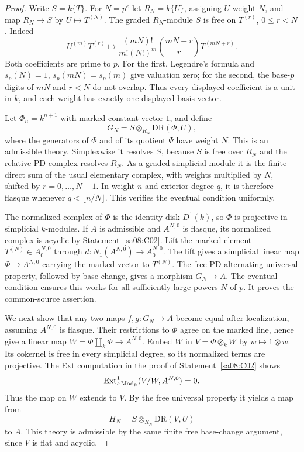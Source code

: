 \begin{proof}
Write $S=k\{T\}$. For $N=p^e$ let $R_N=k\{U\}$, assigning $U$
weight $N$, and map $R_N\to S$ by $U\mapsto T^{(N)}$. The graded
$R_N$-module $S$ is free on $T^{(r)}$, $0\le r<N$. Indeed
\[
 U^{(m)}T^{(r)}\longmapsto
 \frac{(mN)!}{m!(N!)^m}\binom{mN+r}{r}T^{(mN+r)}.
\]
Both coefficients are prime to $p$. For the first, Legendre's
formula and $s_p(N)=1$, $s_p(mN)=s_p(m)$ give valuation zero; for
the second, the base-$p$ digits of $mN$ and $r<N$ do not overlap.
Thus every displayed coefficient is a unit in $k$, and each weight
has exactly one displayed basis vector.

Let $\Phi_n=k^{n+1}$ with marked constant vector $1$, and define
\[
 G_N=S\otimes_{R_N}\mathrm{DR}(\Phi,U),
\]
where the generators of $\Phi$ and of its quotient $\Psi$ have
weight $N$. This is an admissible theory. Simplexwise it resolves
$S$, because $S$ is free over $R_N$ and the relative PD complex
resolves $R_N$. As a graded simplicial module it is the finite direct
sum of the usual elementary complex, with weights multiplied by
$N$, shifted by $r=0,\ldots,N-1$. In weight $n$ and exterior degree
$q$, it is therefore flasque whenever
$q<\lfloor n/N\rfloor$. This verifies the eventual condition
uniformly.

The normalized complex of $\Phi$ is the identity disk $D^1(k)$,
so $\Phi$ is projective in simplicial $k$-modules. If $A$ is
admissible and $A^{N,0}$ is flasque, its normalized complex is
acyclic by Statement~\ref{sa08:C02}. Lift the marked element
$T^{(N)}\in A_0^{N,0}$ through
$d:N_1(A^{N,0})\to A_0^{N,0}$. The lift gives a simplicial linear
map $\Phi\to A^{N,0}$ carrying the marked vector to $T^{(N)}$.
The free PD-alternating universal property, followed by base change,
gives a morphism $G_N\to A$. The eventual condition ensures this
works for all sufficiently large powers $N$ of $p$. It proves the
common-source assertion.

We next show that any two maps $f,g:G_N\to A$ become equal after
localization, assuming $A^{N,0}$ is flasque. Their restrictions to
$\Phi$ agree on the marked line, hence give a linear map
$W=\Phi\amalg_k\Phi\to A^{N,0}$. Embed $W$ in
$V=\Phi\otimes_k W$ by $w\mapsto1\otimes w$. Its cokernel is
free in every simplicial degree, so its normalized terms are
projective. The Ext computation in the proof of
Statement~\ref{sa08:C02} shows
\[
 \operatorname{Ext}^1_{s\operatorname{Mod}_k}(V/W,A^{N,0})=0.
\]
Thus the map on $W$ extends to $V$. By the free universal property
it yields a map from
\[
 H_N=S\otimes_{R_N}\mathrm{DR}(V,U)
\]
to $A$. This theory is admissible by the same finite free
base-change argument, since $V$ is flat and acyclic.


\end{proof}
